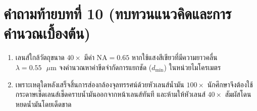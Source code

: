 \section*{คำถามท้ายบทที่ 10 (ทบทวนแนวคิดและการคำนวณเบื้องต้น)}
\begin{enumerate}
    \item เลนส์ใกล้วัตถุขนาด $40\times$ มีค่า $\text{NA} = 0.65$ หากใช้แสงสีเขียวที่มีความยาวคลื่น $\lambda = 0.55\text{ }\mu\text{m}$ จงคำนวณหาค่าขีดจำกัดการแยกชัด ($d_{\min}$) ในหน่วยไมโครเมตร
    \item เพราะเหตุใดหลังเสร็จสิ้นการส่องกล้องจุลทรรศน์ด้วยหัวเลนส์น้ำมัน $100\times$ นักศึกษาจึงต้องใช้กระดาษเช็ดเลนส์เช็ดคราบน้ำมันออกจากหน้าเลนส์ทันที และห้ามให้หัวเลนส์ $40\times$ สัมผัสโดนหยดน้ำมันโดยเด็ดขาด
\end{enumerate}
